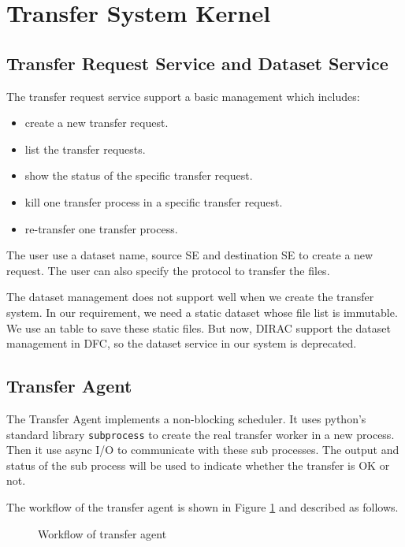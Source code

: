 \section{Transfer System Kernel}

\subsection{Transfer Request Service and Dataset Service}

The transfer request service support a basic management which includes:
\begin{itemize}
    \item create a new transfer request.
    \item list the transfer requests.
    \item show the status of the specific transfer request.
    \item kill one transfer process in a specific transfer request.
    \item re-transfer one transfer process.
\end{itemize}
The user use a dataset name, source SE and destination SE to create a 
new request. The user can also specify the protocol to transfer the files.

The dataset management does not support well when we create the transfer 
system. In our requirement, we need a static dataset whose file list
is immutable. We use an table to save these static files.
But now, DIRAC support the dataset management in DFC, so the dataset
service in our system is deprecated.
\subsection{Transfer Agent}

The Transfer Agent implements a non-blocking scheduler.
It uses python's standard library {\tt subprocess} to 
create the real transfer worker in a new process.
Then it use async I/O to communicate with these sub processes.
The output and status of the sub process will be used 
to indicate whether the transfer is OK or not.

The workflow of the transfer agent is shown in Figure \ref{fig:agent}
and described as follows.
\begin{figure}
    
    \caption{Workflow of transfer agent} \label{fig:agent}
\end{figure}

